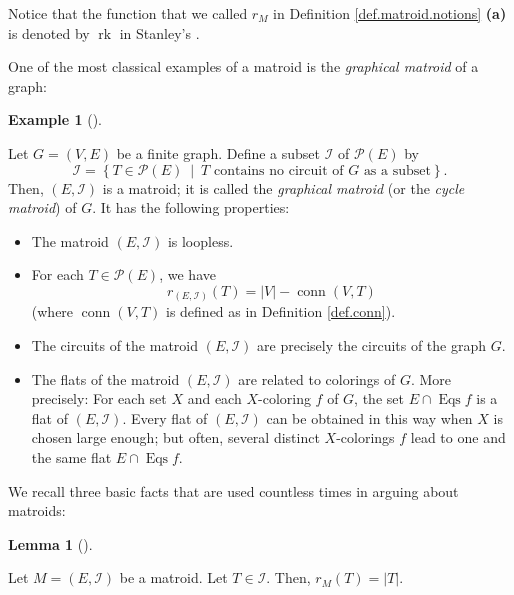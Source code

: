 \documentclass[numbers=enddot,12pt,final,onecolumn,notitlepage]{scrartcl}%
\theoremstyle{definition}
\newtheorem{lem}[theo]{Lemma}
\newenvironment{lemma}[1][]
{\begin{lem}[#1]\begin{leftbar}}
{\end{leftbar}\end{lem}}
\newtheorem{exmp}[theo]{Example}
\newenvironment{example}[1][]
{\begin{exmp}[#1]\begin{leftbar}}
{\end{leftbar}\end{exmp}}
\begin{document}
Notice that the function that we called $r_{M}$ in Definition
\ref{def.matroid.notions} \textbf{(a)} is denoted by $\operatorname*{rk}$ in
Stanley's \cite[Lecture 3]{Stanley}.

One of the most classical examples of a matroid is the \textit{graphical
matroid} of a graph:

\begin{example}
\label{exam.matroid.graphical}Let $G=\left(  V,E\right)  $ be a finite graph.
Define a subset $\mathcal{I}$ of $\mathcal{P}\left(  E\right)  $ by%
\[
\mathcal{I}=\left\{  T\in\mathcal{P}\left(  E\right)  \ \mid\ T\text{ contains
no circuit of }G\text{ as a subset}\right\}  .
\]
Then, $\left(  E,\mathcal{I}\right)  $ is a matroid; it is called the
\textit{graphical matroid} (or the \textit{cycle matroid}) of $G$. It has the
following properties:

\begin{itemize}
\item The matroid $\left(  E,\mathcal{I}\right)  $ is loopless.

\item For each $T\in\mathcal{P}\left(  E\right)  $, we have%
\[
r_{\left(  E,\mathcal{I}\right)  }\left(  T\right)  =\left\vert V\right\vert
-\operatorname*{conn}\left(  V,T\right)
\]
(where $\operatorname*{conn}\left(  V,T\right)  $ is defined as in Definition
\ref{def.conn}).

\item The circuits of the matroid $\left(  E,\mathcal{I}\right)  $ are
precisely the circuits of the graph $G$.

\item The flats of the matroid $\left(  E,\mathcal{I}\right)  $ are related to
colorings of $G$. More precisely: For each set $X$ and each $X$-coloring $f$
of $G$, the set $E\cap\operatorname*{Eqs}f$ is a flat of $\left(
E,\mathcal{I}\right)  $. Every flat of $\left(  E,\mathcal{I}\right)  $ can be
obtained in this way when $X$ is chosen large enough; but often, several
distinct $X$-colorings $f$ lead to one and the same flat $E\cap
\operatorname*{Eqs}f$.
\end{itemize}
\end{example}

We recall three basic facts that are used countless times in arguing about matroids:

\begin{lemma}
\label{lem.matroid.rI}Let $M=\left(  E,\mathcal{I}\right)  $ be a matroid. Let
$T\in\mathcal{I}$. Then, $r_{M}\left(  T\right)  =\left\vert T\right\vert $.
\end{lemma}
\end{document}

